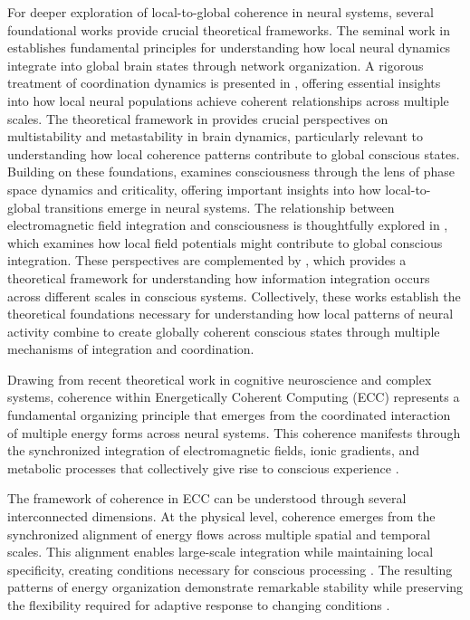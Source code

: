 For deeper exploration of local-to-global coherence in neural systems, several foundational works provide crucial theoretical frameworks. The seminal work in \cite{Sporns2011} establishes fundamental principles for understanding how local neural dynamics integrate into global brain states through network organization. A rigorous treatment of coordination dynamics is presented in \cite{Bressler2016}, offering essential insights into how local neural populations achieve coherent relationships across multiple scales. The theoretical framework in \cite{Kelso2012} provides crucial perspectives on multistability and metastability in brain dynamics, particularly relevant to understanding how local coherence patterns contribute to global conscious states. Building on these foundations, \cite{Werner2013} examines consciousness through the lens of phase space dynamics and criticality, offering important insights into how local-to-global transitions emerge in neural systems. The relationship between electromagnetic field integration and consciousness is thoughtfully explored in \cite{McFadden2020}, which examines how local field potentials might contribute to global conscious integration. These perspectives are complemented by \cite{Tononi2015}, which provides a theoretical framework for understanding how information integration occurs across different scales in conscious systems. Collectively, these works establish the theoretical foundations necessary for understanding how local patterns of neural activity combine to create globally coherent conscious states through multiple mechanisms of integration and coordination.

Drawing from recent theoretical work in cognitive neuroscience and complex systems, coherence within Energetically Coherent Computing (ECC) represents a fundamental organizing principle that emerges from the coordinated interaction of multiple energy forms across neural systems. This coherence manifests through the synchronized integration of electromagnetic fields, ionic gradients, and metabolic processes that collectively give rise to conscious experience \cite{McFadden2020, Werner2013}.

The framework of coherence in ECC can be understood through several interconnected dimensions. At the physical level, coherence emerges from the synchronized alignment of energy flows across multiple spatial and temporal scales. This alignment enables large-scale integration while maintaining local specificity, creating conditions necessary for conscious processing \cite{Kelso2012}. The resulting patterns of energy organization demonstrate remarkable stability while preserving the flexibility required for adaptive response to changing conditions \cite{Freeman2007}.

